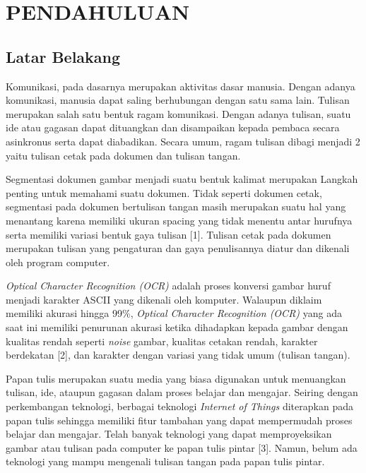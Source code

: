 \section{PENDAHULUAN}

\subsection{Latar Belakang}

Komunikasi, pada dasarnya merupakan aktivitas dasar manusia. Dengan adanya komunikasi, manusia dapat saling berhubungan dengan satu sama lain. Tulisan merupakan salah satu bentuk ragam komunikasi. Dengan adanya tulisan, suatu ide atau gagasan dapat dituangkan dan disampaikan kepada pembaca secara asinkronus serta dapat diabadikan. Secara umum, ragam tulisan dibagi menjadi 2 yaitu tulisan cetak pada dokumen dan tulisan tangan.\par
Segmentasi dokumen gambar menjadi suatu bentuk kalimat merupakan Langkah penting untuk memahami suatu dokumen. Tidak seperti dokumen cetak, segmentasi pada dokumen bertulisan tangan masih merupakan suatu hal yang menantang karena memiliki ukuran spacing yang tidak menentu antar hurufnya serta memiliki variasi bentuk gaya tulisan [1]. Tulisan cetak pada dokumen merupakan tulisan yang pengaturan dan gaya penulisannya diatur dan dikenali oleh program computer.\par
\textit{Optical Character Recognition (OCR)} adalah proses konversi gambar huruf menjadi karakter ASCII yang dikenali oleh komputer. Walaupun diklaim memiliki akurasi hingga 99\%, \textit{Optical Character Recognition (OCR)} yang ada saat ini memiliki penurunan akurasi ketika dihadapkan kepada gambar dengan kualitas rendah seperti \textit{noise} gambar, kualitas cetakan rendah, karakter berdekatan [2], dan karakter dengan variasi yang tidak umum (tulisan tangan).\par
Papan tulis merupakan suatu media yang biasa digunakan untuk menuangkan tulisan, ide, ataupun gagasan dalam proses belajar dan mengajar. Seiring dengan perkembangan teknologi, berbagai teknologi \textit{Internet of Things} diterapkan pada papan tulis sehingga memiliki fitur tambahan yang dapat mempermudah proses belajar dan mengajar. Telah banyak teknologi yang dapat memproyeksikan gambar atau tulisan pada computer ke papan tulis pintar [3]. Namun, belum ada teknologi yang mampu mengenali tulisan tangan pada papan tulis pintar.



